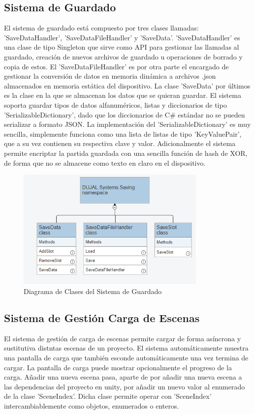 \subsection{Sistema de Guardado}
El sistema de guardado está compuesto por tres clases llamadas: 'SaveDataHandler', 'SaveDataFileHandler' y 'SaveData'. 'SaveDataHandler' es una clase de tipo Singleton que 
sirve como API para gestionar las llamadas al guardado, creación de nuevos archivos de guardado u operaciones de borrado y copia de estos. El 'SaveDataFileHandler' es por 
otra parte el encargado de gestionar la conversión de datos en memoria dinámica a archivos .json almacenados en memoria estática del dispositivo. La clase 'SaveData' por últimos
es la clase en la que se almacenan los datos que se quieran guardar. El sistema soporta guardar tipos de datos alfanuméricos, listas y diccionarios de tipo 
'SerializableDictionary', dado que los diccionarios de C\# estándar no se pueden serializar a formato JSON. La implementación del 'SerializableDictionary' es muy sencilla, 
simplemente funciona como una lista de listas de tipo 'KeyValuePair', que a su vez contienen su respectiva clave y valor. Adicionalmente el sistema permite encriptar la 
partida guardada con una sencilla función de hash de XOR, de forma que no se almacene como texto en claro en el dispositivo.  

\begin{figure}[H]
  \centering
    \includegraphics[width=350px,clip=true]{Saving.png}
  \caption{Diagrama de Clases del Sistema de Guardado}
  \label{fig:savinguml}
\end{figure}

\subsection{Sistema de Gestión Carga de Escenas}
El sistema de gestión de carga de escenas permite cargar de forma asíncrona y sustitutiva distntas escenas de un proyecto. El sistema automáticamente muestra una 
pantalla de carga que también esconde automáticamente una vez termina de cargar. La pantalla de carga puede mostrar opcionalmente el progreso de la carga. Añadir una nueva
 escena pasa, aparte de por añadir una nueva escena a las dependencias del proyecto en unity, por añadir un nuevo valor al enumerado de la clase 'SceneIndex'. Dicha clase 
 permite operar con 'SceneIndex' intercambiablemente como objetos, enumerados o enteros.

